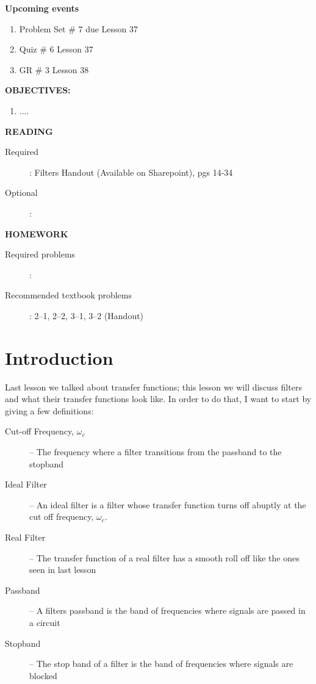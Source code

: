 \documentclass{handout}
\begin{document}
\maketitle

\textbf{Upcoming events}
\begin{enumerate}
\item Problem Set \# 7 due Lesson 37
\item Quiz \# 6 Lesson 37
\item GR \# 3 Lesson 38
\end{enumerate}

\textbf{OBJECTIVES:}
\begin{enumerate}
\item ....
\end{enumerate}

\textbf{READING}
\begin{description}
\item [Required]:
Filters Handout (Available on Sharepoint), pgs 14-34
\item [Optional]: 
\end{description}

\textbf{HOMEWORK}
\begin{description}
\item [Required problems]: 
\item [Recommended textbook problems]: 2--1, 2--2, 3--1, 3--2 (Handout)
\end{description}

\section{Introduction}
Last lesson we talked about transfer functions; this lesson we will discuss filters and what their transfer functions look like.  In order to do that, I want to start by giving a few definitions:
\begin{description}
\item [Cut-off Frequency, $\omega_c$] -- The frequency where a filter transitions from the passband to the stopband
\item [Ideal Filter] -- An ideal filter is a filter whose transfer function turns off abuptly at the cut off frequency, $\omega_c$.
\item [Real Filter] -- The transfer function of a real filter has a smooth roll off like the ones seen in last lesson
\item [Passband] -- A filters passband is the band of frequencies where signals are passed in a circuit
\item [Stopband] -- The stop band of a filter is the band of frequencies where signals are blocked
\end{description}
\end{document}
